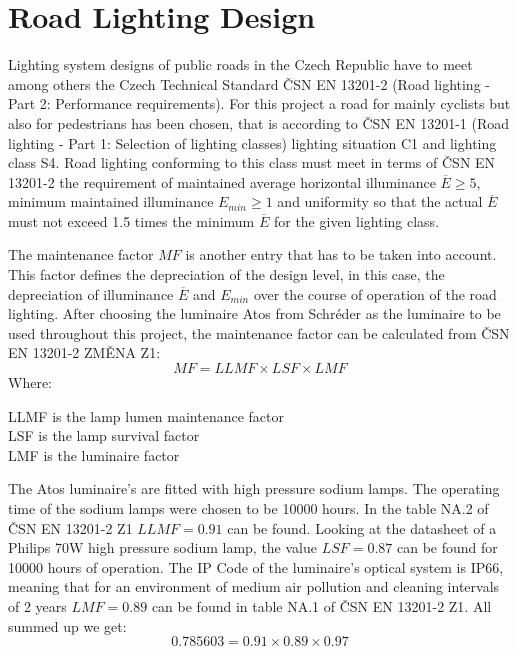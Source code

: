\section{Road Lighting Design}
Lighting system designs of public roads in the Czech Republic have to meet among others the Czech Technical Standard \v{C}SN EN 13201-2 (Road lighting - Part 2: Performance requirements). For this project a road for mainly cyclists but also for pedestrians has been chosen, that is according to \v{C}SN EN 13201-1 (Road lighting - Part 1: Selection of lighting classes) lighting situation C1 and lighting class S4. Road lighting conforming to this class must meet in terms of \v{C}SN EN 13201-2 the requirement of maintained average horizontal illuminance $\overline{E}\geq 5$, minimum maintained illuminance $E_{min}\geq 1$ and uniformity so that the actual $\overline{E}$ must not exceed 1.5 times the minimum $\overline{E}$ for the given lighting class.

The maintenance factor $MF$ is another entry that has to be taken into account. This factor defines the depreciation of the design level, in this case, the depreciation of illuminance $\overline{E}$ and $E_{min}$ over the course of operation of the road lighting. After choosing the luminaire Atos from Schr\'{e}der as the luminaire to be used throughout this project, the maintenance factor can be calculated from \v{C}SN EN 13201-2 ZM\v{E}NA Z1:
\begin{equation}
MF=LLMF \times LSF \times LMF
\end{equation}
Where:
\begin{description}
	\item[LLMF is the lamp lumen maintenance factor]
	\item[LSF is the lamp survival factor]
	\item[LMF is the luminaire factor]
\end{description}

The Atos luminaire's are fitted with high pressure sodium lamps. The operating time of the sodium lamps were chosen to be 10000 hours. In the table NA.2 of \v{C}SN EN 13201-2 Z1 $LLMF=0.91$ can be found. Looking at the datasheet of a Philips 70W high pressure sodium lamp, the value $LSF=0.87$ can be found for 10000 hours of operation. The IP Code of the luminaire's optical system is IP66, meaning that for an environment of medium air pollution and cleaning intervals of 2 years $LMF=0.89$ can be found in table NA.1 of \v{C}SN EN 13201-2 Z1. All summed up we get:
\begin{equation}
0.785603=0.91 \times 0.89 \times 0.97
\end{equation}
